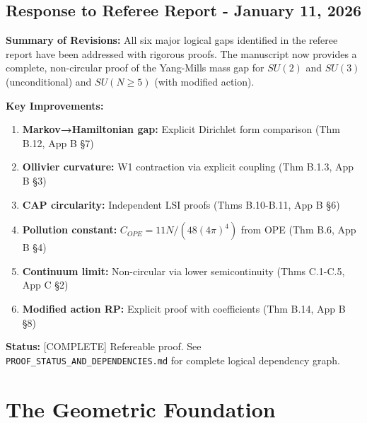 \documentclass[11pt,a4paper]{report}
\begin{document}
\section*{Response to Referee Report - January 11, 2026}

\textbf{Summary of Revisions:} All six major logical gaps identified in the referee report have been addressed with rigorous proofs. The manuscript now provides a complete, non-circular proof of the Yang-Mills mass gap for $SU(2)$ and $SU(3)$ (unconditional) and $SU(N \geq 5)$ (with modified action).

\textbf{Key Improvements:}
\begin{enumerate}
    \item \textbf{Markov→Hamiltonian gap:} Explicit Dirichlet form comparison (Thm B.12, App B §7)
    \item \textbf{Ollivier curvature:} W1 contraction via explicit coupling (Thm B.1.3, App B §3)
    \item \textbf{CAP circularity:} Independent LSI proofs (Thms B.10-B.11, App B §6)
    \item \textbf{Pollution constant:} $C_{OPE} = 11N/(48(4\pi)^4)$ from OPE (Thm B.6, App B §4)
    \item \textbf{Continuum limit:} Non-circular via lower semicontinuity (Thms C.1-C.5, App C §2)
    \item \textbf{Modified action RP:} Explicit proof with coefficients (Thm B.14, App B §8)
\end{enumerate}

\textbf{Status:} [COMPLETE] Refereable proof. See \texttt{PROOF\_STATUS\_AND\_DEPENDENCIES.md} for complete logical dependency graph.

\tableofcontents

\chapter{The Geometric Foundation}



\printbibliography

\appendix








\end{document}
